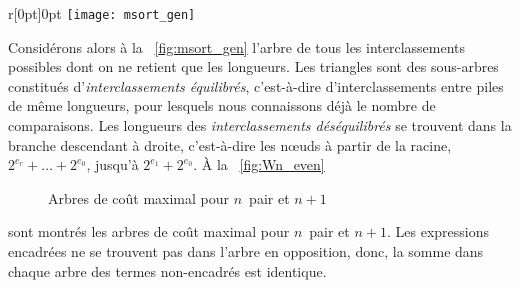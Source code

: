 \begin{wrapfigure}[9]{r}[0pt]{0pt}
\centering
\texttt{[image: msort\_gen]}%
\caption{\(\sum_{j=0}^{r}2^{e_j}\) clés}
\label{fig:msort_gen}
\end{wrapfigure}
Considérons alors à la \fig~\ref{fig:msort_gen} l'arbre de tous les
interclassements possibles
dont on ne retient que les longueurs. Les triangles sont des
sous-arbres constitués d'\emph{interclassements équilibrés},
c'est-à-dire d'interclassements entre piles de même longueurs, pour
lesquels nous connaissons déjà le nombre de comparaisons. Les
longueurs des \emph{interclassements déséquilibrés} se trouvent dans
la branche descendant à droite, c'est-à-dire les n{\oe}uds à partir de
la racine, \(2^{e_r}+ \dots + 2^{e_0}\), jusqu'à \(2^{e_1} +
2^{e_0}\). À la
\fig~\vref{fig:Wn_even}
\begin{figure}[b]
\centering
{} %
\qquad
{}
\caption{Arbres de coût maximal pour \(n\)~pair et \(n+1\)}
\label{fig:Wn_even}
\end{figure}
sont montrés les arbres de coût maximal pour \(n\)~pair et
\(n+1\). Les expressions encadrées ne se trouvent pas dans l'arbre en
opposition, donc, la somme dans chaque arbre des termes non-encadrés
est identique.
